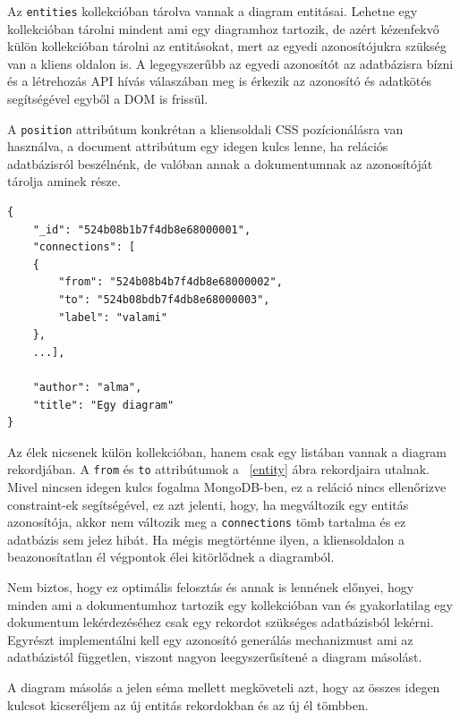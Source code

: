 Az \lstinline{entities} kollekcióban tárolva vannak a diagram entitásai. Lehetne egy kollekcióban tárolni mindent ami egy diagramhoz tartozik, de azért kézenfekvő külön kollekcióban tárolni az entitásokat, mert az egyedi azonosítójukra szükség van a kliens oldalon is. A legegyszerűbb az egyedi azonosítót az adatbázisra bízni és a létrehozás API hívás válaszában meg is érkezik az azonosító és adatkötés segítségével egyből a DOM is frissül.  

A \lstinline{position} attribútum konkrétan a kliensoldali CSS pozícionálásra van használva, a document attribútum egy idegen kulcs lenne, ha relációs adatbázisról beszélnénk, de valóban annak a dokumentumnak az azonosítóját tárolja aminek része.

\begin{lstlisting}[caption=Egy diagram és élei reprezentálása az adatbázisban]
{
    "_id": "524b08b1b7f4db8e68000001",
    "connections": [
    {
        "from": "524b08b4b7f4db8e68000002",
        "to": "524b08bdb7f4db8e68000003",
        "label": "valami"
    },
    ...],

    "author": "alma",
    "title": "Egy diagram" 
}
\end{lstlisting}

Az élek nicsenek külön kollekcióban, hanem csak egy listában vannak a diagram rekordjában. A \lstinline{from} és \lstinline{to} attribútumok a ~\ref{entity} ábra rekordjaira utalnak. Mivel nincsen idegen kulcs fogalma MongoDB-ben, ez a reláció nincs ellenőrizve constraint-ek segítségével, ez azt jelenti, hogy, ha megváltozik egy entitás azonosítója, akkor nem változik meg a \lstinline{connections} tömb tartalma és ez adatbázis sem jelez hibát. Ha mégis megtörténne ilyen, a kliensoldalon a beazonosítatlan él végpontok élei kitörlődnek a diagramból. 

Nem biztos, hogy ez optimális felosztás és annak is lennének előnyei, hogy minden ami a dokumentumhoz tartozik egy kollekcióban van és gyakorlatilag egy dokumentum lekérdezéséhez csak egy rekordot szükséges adatbázisból lekérni. Egyrészt implementálni kell egy azonosító generálás mechanizmust ami az adatbázistól független, viszont nagyon leegyszerűsítené a diagram másolást.

A diagram másolás a jelen séma mellett megköveteli azt, hogy az összes idegen kulcsot kicseréljem az új entitás rekordokban és az új él tömbben.



